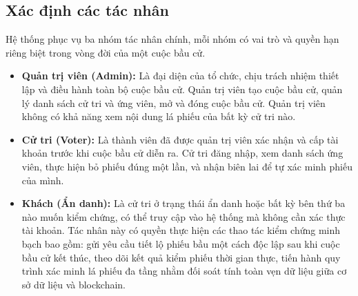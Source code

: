 \subsection{Xác định các tác nhân}

Hệ thống phục vụ ba nhóm tác nhân chính, mỗi nhóm có vai trò và quyền hạn riêng biệt trong vòng đời của một cuộc bầu cử.

\begin{itemize}
    \item \textbf{Quản trị viên (Admin):} Là đại diện của tổ chức, chịu trách nhiệm thiết lập và điều hành toàn bộ cuộc bầu cử. Quản trị viên tạo cuộc bầu cử, quản lý danh sách cử tri và ứng viên, mở và đóng cuộc bầu cử. Quản trị viên không có khả năng xem nội dung lá phiếu của bất kỳ cử tri nào.

    \item \textbf{Cử tri (Voter):} Là thành viên đã được quản trị viên xác nhận và cấp tài khoản trước khi cuộc bầu cử diễn ra. Cử tri đăng nhập, xem danh sách ứng viên, thực hiện bỏ phiếu đúng một lần, và nhận biên lai để tự xác minh phiếu của mình.

    \item \textbf{Khách (Ẩn danh):} Là cử tri ở trạng thái ẩn danh hoặc bất kỳ bên thứ ba nào muốn kiểm chứng, có thể truy cập vào hệ thống mà không cần xác thực tài khoản. Tác nhân này có quyền thực hiện các thao tác kiểm chứng minh bạch bao gồm: gửi yêu cầu tiết lộ phiếu bầu một cách độc lập sau khi cuộc bầu cử kết thúc, theo dõi kết quả kiểm phiếu thời gian thực, tiến hành quy trình xác minh lá phiếu đa tầng nhằm đối soát tính toàn vẹn dữ liệu giữa cơ sở dữ liệu và blockchain.
\end{itemize}